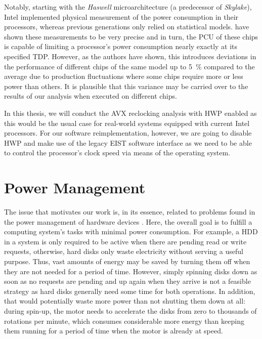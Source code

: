 {Notably, starting with the \textit{Haswell} microarchitecture (a predecessor of \textit{Skylake}), Intel implemented physical measurement of the power consumption in their processors, whereas previous generations only relied on statistical models. \citeauthor{schuchart2016shift} \cite{schuchart2016shift} have shown these measurements to be very precise and in turn, the \gls{PCU} of these chips is capable of limiting a processor's power consumption nearly exactly at its specified \gls{TDP}. However, as the authors have shown, this introduces deviations in the performance of different chips of the same model up to \SI{5}{\percent} compared to the average due to production fluctuations where some chips require more or less power than others. It is plausible that this variance may be carried over to the results of our analysis when executed on different chips.

In this thesis, we will conduct the \gls{AVX} reclocking analysis with \gls{HWP} enabled as this would be the usual case for real-world systems equipped with current Intel processors. For our software reimplementation, however, we are going to disable \gls{HWP} and make use of the legacy EIST software interface as we need to be able to control the processor's clock speed via means of the operating system.

\section{Power Management}
\label{sec:background:powermanagement}

The issue that motivates our work is, in its essence, related to problems found in the power management of hardware devices \cite{lu2001comparing}. Here, the overall goal is to fulfill a computing system's tasks with minimal power consumption. For example, a \gls{HDD} in a system is only required to be active when there are pending read or write requests, otherwise, hard disks only waste electricity without serving a useful purpose. Thus, vast amounts of energy may be saved by turning them off when they are not needed for a period of time. However, simply spinning disks down as soon as no requests are pending and up again when they arrive is not a feasible strategy as hard disks generally need some time for both operations. In addition, that would potentially waste more power than not shutting them down at all: during spin-up, the motor needs to accelerate the disks from zero to thousands of rotations per minute, which consumes considerable more energy than keeping them running for a period of time when the motor is already at speed.

}
